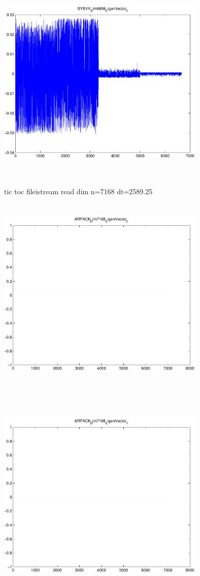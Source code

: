 \documentclass[9pt]{article}
\theoremstyle{plain}
\theoremstyle{definition}
\theoremstyle{remark}
\numberwithin{equation}{section}
\begin{document}
\includegraphics[width=10.0cm,height=10.0cm]{SYEVX_Dim6656_EigenVector_4.pdf}

tic toc fileistream read dim n=7168 dt=2589.25
\includegraphics[width=10.0cm,height=10.0cm]{ARPACK_Dim7168_EigenVector_0.pdf}

\includegraphics[width=10.0cm,height=10.0cm]{ARPACK_Dim7168_EigenVector_1.pdf}
\end{document}
